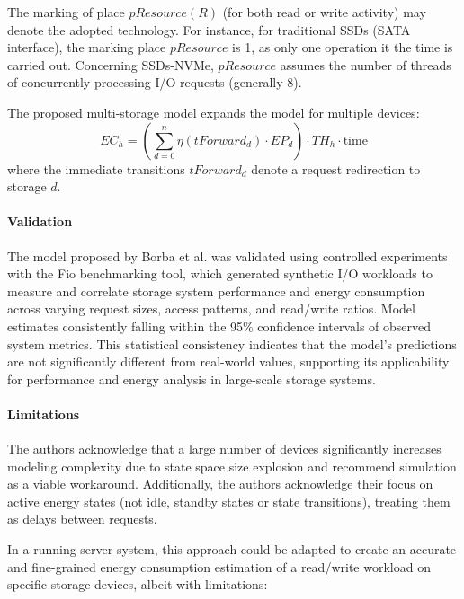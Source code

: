 The marking of place $pResource (R)$ (for both read or write activity) may denote the adopted technology. For instance, for traditional SSDs (SATA interface), the marking place $pResource$ is 1, as only one operation it the time is carried out. Concerning SSDs-NVMe, $pResource$ assumes the number of threads of concurrently processing I/O requests (generally 8).

The proposed multi-storage model expands the model for multiple devices:
\begin{equation}
    EC_h = \left( \sum_{d=0}^{n} \eta(tForward_d) \cdot EP_d \right) \cdot TH_h \cdot \text{time}
\end{equation}
where the immediate transitions $tForward_d$ denote a request redirection to storage $d$.

\paragraph{Validation}
The model proposed by Borba et al. was validated using controlled experiments with the Fio benchmarking tool, which generated synthetic I/O workloads to measure and correlate storage system performance and energy consumption across varying request sizes, access patterns, and read/write ratios. Model estimates consistently falling within the 95\% confidence intervals of observed system metrics. This statistical consistency indicates that the model's predictions are not significantly different from real-world values, supporting its applicability for performance and energy analysis in large-scale storage systems.

\paragraph{Limitations}
The authors acknowledge that a large number of devices significantly increases modeling complexity due to state space size explosion and recommend simulation as a viable workaround. Additionally, the authors acknowledge their focus on active energy states (not idle, standby states or state transitions), treating them as delays between requests. 

In a running server system, this approach could be adapted to create an accurate and fine-grained energy consumption estimation of a read/write workload on specific storage devices, albeit with limitations:

